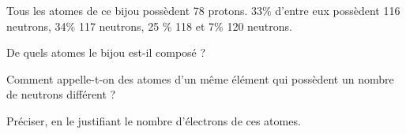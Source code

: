 \documentclass[a4paper,11pt]{exam}
\begin{document}
Tous les atomes de ce bijou possèdent 78 protons. 33\% d'entre eux possèdent 116 neutrons, 34\% 117 neutrons, 25 \% 118 et 7\% 120 neutrons.

\begin{questions}
	\question De quels atomes le bijou est-il composé ?
	\fillwithdottedlines{1.5cm}
	
	\question Comment appelle-t-on des atomes d'un même élément qui possèdent un nombre de neutrons différent ?
	\fillwithdottedlines{1.5cm}
	
	\question Préciser, en le justifiant le nombre d'électrons de ces atomes.
	\fillwithdottedlines{2cm}
\end{questions}

\ \label{LastPage}
\end{document}
